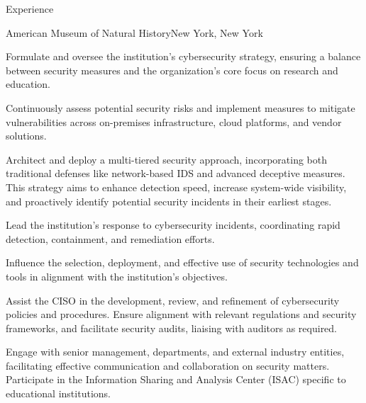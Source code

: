 \documentclass[]{mcdowellcv}
\begin{document}
\makeheader

\begin{cvsection}{Experience}

    \begin{jobentry}{American Museum of Natural History}{New York, New York}
    \begin{jobpositions}
    \end{jobpositions}
        
        \begin{jobresponsibilities}
            \item Formulate and oversee the institution's cybersecurity strategy, ensuring a balance between security measures and the organization's core focus on research and education.
            \item Continuously assess potential security risks and implement measures to mitigate vulnerabilities across on-premises infrastructure, cloud platforms, and vendor solutions.
            \item Architect and deploy a multi-tiered security approach, incorporating both traditional defenses like network-based IDS and advanced deceptive measures. This strategy aims to enhance detection speed, increase system-wide visibility, and proactively identify potential security incidents in their earliest stages.
            \item Lead the institution's response to cybersecurity incidents, coordinating rapid detection, containment, and remediation efforts.
            \item Influence the selection, deployment, and effective use of security technologies and tools in alignment with the institution's objectives.
            \item Assist the CISO in the development, review, and refinement of cybersecurity policies and procedures. Ensure alignment with relevant regulations and security frameworks, and facilitate security audits, liaising with auditors as required.
            \item Engage with senior management, departments, and external industry entities, facilitating effective communication and collaboration on security matters. Participate in the Information Sharing and Analysis Center (ISAC) specific to educational institutions.
        \end{jobresponsibilities}
        

\end{jobentry}
\end{cvsection}
\end{document}
